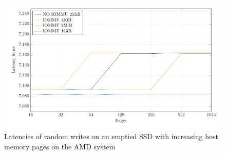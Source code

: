 \begin{figure}[H]
  \centering
  \includegraphics[width=\textwidth]{figures/psmedsepyc}
  \caption{Latencies of random writes on an emptied SSD with increasing host memory pages on the AMD system}
  \label{fig:med-psepyc}
\end{figure}



